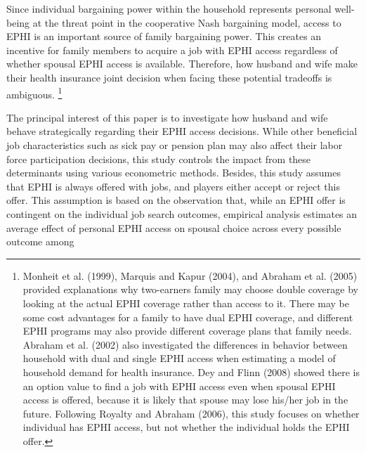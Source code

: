 \documentclass[legno,11pt]{article}
\begin{document}
Since individual bargaining power within the household represents
personal well-being at the threat point in the cooperative Nash
bargaining model, access to EPHI is an important source of family
bargaining power. This creates an incentive for family members to
acquire a job with EPHI access regardless of whether spousal EPHI
access is available. Therefore, how husband and wife make their
health insurance joint decision
when facing these potential tradeoffs is ambiguous.%
\footnote{Monheit et al. (1999), Marquis and Kapur (2004), and
Abraham et al. (2005) provided explanations why two-earners family
may choose double coverage by looking at the actual EPHI coverage
rather than access to it. There may be some cost advantages for a
family to have dual EPHI coverage, and different EPHI programs may
also provide different coverage plans that family needs. Abraham et
al. (2002) also investigated the differences in behavior between
household with dual and single EPHI access when estimating a model
of household demand for health insurance. Dey and Flinn (2008)
showed there is an option value to find a job with EPHI access even
when spousal EPHI access is offered, because it is likely that
spouse may lose his/her job in the future. Following Royalty and
Abraham (2006), this study focuses on whether individual has EPHI
access, but not whether the individual holds the EPHI offer.}
\par
The principal interest of this paper is to investigate how husband
and wife behave strategically regarding their EPHI access decisions.
While other beneficial job characteristics such as sick pay or
pension plan may also affect their labor force participation
decisions, this study controls the impact from these determinants
using various econometric methods.  Besides, this study assumes that
EPHI is always offered with jobs, and players either accept or
reject this offer. This assumption is based on the observation that,
while an EPHI offer is contingent on the individual job search
outcomes, empirical analysis estimates an average effect of personal
EPHI access on spousal choice across every possible outcome among
\end{document}
